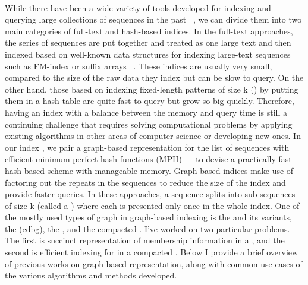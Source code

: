 \paragraph*{}
While there have been a wide variety of tools developed
for indexing and querying large collections of sequences in the past
~\citep{li2008mapping,langmead2009ultrafast,li2009fast,hach2010mrsfast,langmead2012fast,li2013aligning,liao2013subread,dobin2013star,kim2015hisat},
we can divide them into two main categories of full-text and hash-based indices.
In the full-text approaches, the series of sequences are put together and treated as one large text
and then indexed based on well-known data structures for indexing large-text sequences
such as FM-index or suffix arrays
~\citep{langmead2009ultrafast,li2009fast,langmead2012fast,li2013aligning,dobin2013star,kim2015hisat}.
These indices are usually very small, compared to the size of the
raw data they index but can be slow to query.
On the other hand, those based on indexing fixed-length patterns of size k (\kmers)
by putting them in a hash table
are quite fast to query but grow so big quickly.
Therefore, having an index with a balance between the memory and query time
is still a continuing challenge that requires solving computational problems by applying
existing algorithms in other areas of computer science or developing new ones.
In our index \pufferfish, we pair a graph-based representation for the list of sequences
with efficient minimum perfect hash functions (MPH)
~~\cite{limasset2017fast}
to devise a practically fast hash-based scheme with manageable memory.
Graph-based indices make use of factoring out the repeats in the sequences
to reduce the size of the index and provide faster queries.
In these approaches, a sequence
splits into sub-sequences of size k (called a \kmer) where each \kmer is presented only once
in the whole index.
One of the mostly used types of graph in graph-based indexing is the \dbg
and its variants, the \longcdbg (cdbg), the \compdbg, and the compacted \longcdbg.
I’ve worked on two particular problems. The first is succinct representation of membership information
in a \longcdbg, and the second is efficient indexing for \kmers
in a compacted \longcdbg.
Below I provide a brief overview of previous works on graph-based representation,
along with common use cases of the various algorithms and methods developed.

